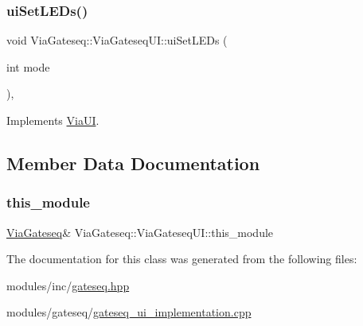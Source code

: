 \subsubsection{\texorpdfstring{ui\+Set\+L\+E\+Ds()}{uiSetLEDs()}}
{\footnotesize\ttfamily void Via\+Gateseq\+::\+Via\+Gateseq\+U\+I\+::ui\+Set\+L\+E\+Ds (\begin{DoxyParamCaption}\item[{int}]{mode }\end{DoxyParamCaption})\hspace{0.3cm}{\ttfamily [override]}, {\ttfamily [virtual]}}



Implements \mbox{\hyperlink{class_via_u_i_a4bd3d575f4efe1273d6e4645454ead52}{Via\+UI}}.



\subsection{Member Data Documentation}
\mbox{\label{class_via_gateseq_1_1_via_gateseq_u_i_ae51cc27ec70247c3fc7a013e20a80450}} 
\subsubsection{\texorpdfstring{this\+\_\+module}{this\_module}}
{\footnotesize\ttfamily \mbox{\hyperlink{class_via_gateseq}{Via\+Gateseq}}\& Via\+Gateseq\+::\+Via\+Gateseq\+U\+I\+::this\+\_\+module}



The documentation for this class was generated from the following files\+:\begin{DoxyCompactItemize}
\item 
modules/inc/\mbox{\hyperlink{gateseq_8hpp}{gateseq.\+hpp}}\item 
modules/gateseq/\mbox{\hyperlink{gateseq__ui__implementation_8cpp}{gateseq\+\_\+ui\+\_\+implementation.\+cpp}}\end{DoxyCompactItemize}
